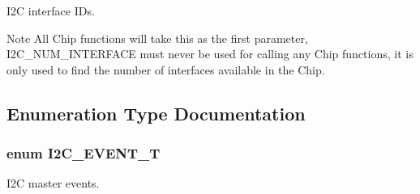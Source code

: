 I2\-C interface I\-Ds. 

\begin{DoxyNote}{Note}
All Chip functions will take this as the first parameter, I2\-C\-\_\-\-N\-U\-M\-\_\-\-I\-N\-T\-E\-R\-F\-A\-C\-E must never be used for calling any Chip functions, it is only used to find the number of interfaces available in the Chip. 
\end{DoxyNote}


\subsection{Enumeration Type Documentation}
\hypertarget{group__I2C__17XX__40XX_gacb2cd4e03ea48339d327e4f387441bf3}{
\subsubsection[{I2\-C\-\_\-\-E\-V\-E\-N\-T\-\_\-\-T}]{\setlength{\rightskip}{0pt plus 5cm}enum {\bf I2\-C\-\_\-\-E\-V\-E\-N\-T\-\_\-\-T}}}\label{group__I2C__17XX__40XX_gacb2cd4e03ea48339d327e4f387441bf3}


I2\-C master events. 

